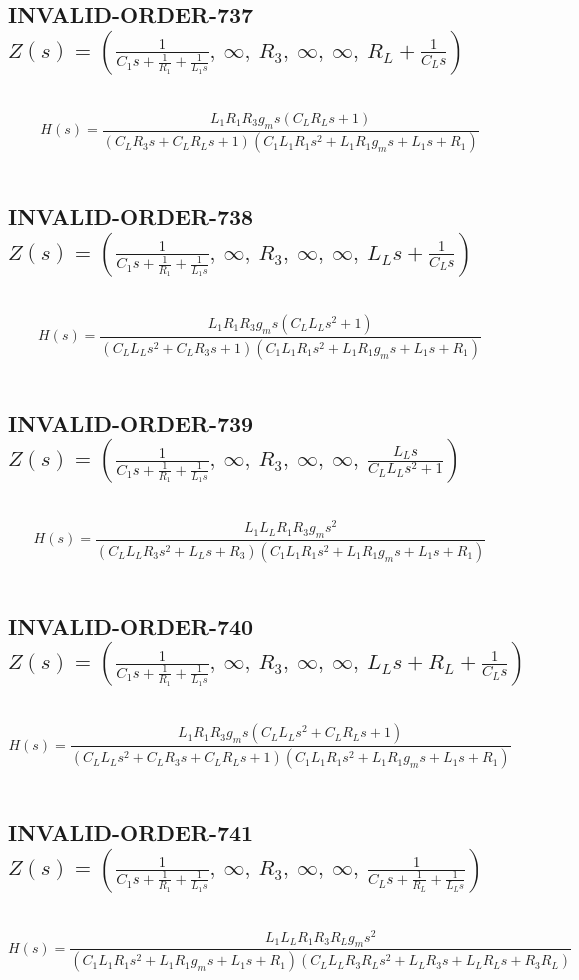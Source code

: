 \documentclass{article}
\begin{document}
\subsection{INVALID-ORDER-737 $Z(s) = \left( \frac{1}{C_{1} s + \frac{1}{R_{1}} + \frac{1}{L_{1} s}}, \  \infty, \  R_{3}, \  \infty, \  \infty, \  R_{L} + \frac{1}{C_{L} s}\right)$ } \ 
\textbf{\[H(s) = \frac{L_{1} R_{1} R_{3} g_{m} s \left(C_{L} R_{L} s + 1\right)}{\left(C_{L} R_{3} s + C_{L} R_{L} s + 1\right) \left(C_{1} L_{1} R_{1} s^{2} + L_{1} R_{1} g_{m} s + L_{1} s + R_{1}\right)}\] } \ 
\subsection{INVALID-ORDER-738 $Z(s) = \left( \frac{1}{C_{1} s + \frac{1}{R_{1}} + \frac{1}{L_{1} s}}, \  \infty, \  R_{3}, \  \infty, \  \infty, \  L_{L} s + \frac{1}{C_{L} s}\right)$ } \ 
\textbf{\[H(s) = \frac{L_{1} R_{1} R_{3} g_{m} s \left(C_{L} L_{L} s^{2} + 1\right)}{\left(C_{L} L_{L} s^{2} + C_{L} R_{3} s + 1\right) \left(C_{1} L_{1} R_{1} s^{2} + L_{1} R_{1} g_{m} s + L_{1} s + R_{1}\right)}\] } \ 
\subsection{INVALID-ORDER-739 $Z(s) = \left( \frac{1}{C_{1} s + \frac{1}{R_{1}} + \frac{1}{L_{1} s}}, \  \infty, \  R_{3}, \  \infty, \  \infty, \  \frac{L_{L} s}{C_{L} L_{L} s^{2} + 1}\right)$ } \ 
\textbf{\[H(s) = \frac{L_{1} L_{L} R_{1} R_{3} g_{m} s^{2}}{\left(C_{L} L_{L} R_{3} s^{2} + L_{L} s + R_{3}\right) \left(C_{1} L_{1} R_{1} s^{2} + L_{1} R_{1} g_{m} s + L_{1} s + R_{1}\right)}\] } \ 
\subsection{INVALID-ORDER-740 $Z(s) = \left( \frac{1}{C_{1} s + \frac{1}{R_{1}} + \frac{1}{L_{1} s}}, \  \infty, \  R_{3}, \  \infty, \  \infty, \  L_{L} s + R_{L} + \frac{1}{C_{L} s}\right)$ } \ 
\textbf{\[H(s) = \frac{L_{1} R_{1} R_{3} g_{m} s \left(C_{L} L_{L} s^{2} + C_{L} R_{L} s + 1\right)}{\left(C_{L} L_{L} s^{2} + C_{L} R_{3} s + C_{L} R_{L} s + 1\right) \left(C_{1} L_{1} R_{1} s^{2} + L_{1} R_{1} g_{m} s + L_{1} s + R_{1}\right)}\] } \ 
\subsection{INVALID-ORDER-741 $Z(s) = \left( \frac{1}{C_{1} s + \frac{1}{R_{1}} + \frac{1}{L_{1} s}}, \  \infty, \  R_{3}, \  \infty, \  \infty, \  \frac{1}{C_{L} s + \frac{1}{R_{L}} + \frac{1}{L_{L} s}}\right)$ } \ 
\textbf{\[H(s) = \frac{L_{1} L_{L} R_{1} R_{3} R_{L} g_{m} s^{2}}{\left(C_{1} L_{1} R_{1} s^{2} + L_{1} R_{1} g_{m} s + L_{1} s + R_{1}\right) \left(C_{L} L_{L} R_{3} R_{L} s^{2} + L_{L} R_{3} s + L_{L} R_{L} s + R_{3} R_{L}\right)}\] } \ 
\end{document}
